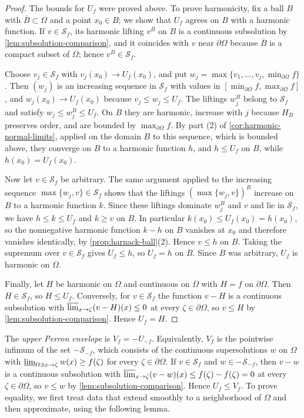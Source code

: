 \begin{proof}
The bounds for $U_f$ were proved above. To prove harmonicity, fix a ball $B$ with $\overline B\subset\Omega$ and a point $x_0\in B$; we show that $U_f$ agrees on $B$ with a harmonic function. If $v\in\mathcal S_f$, its harmonic lifting $v^B$ on $B$ is a continuous subsolution by \cref{lem:subsolution-comparison}, and it coincides with $v$ near $\partial\Omega$ because $\overline B$ is a compact subset of $\Omega$; hence $v^B\in\mathcal S_f$.

Choose $v_j\in\mathcal S_f$ with $v_j(x_0)\to U_f(x_0)$, and put $w_j=\max\{v_1,\ldots,v_j,\min_{\partial\Omega}f\}$. Then $(w_j)$ is an increasing sequence in $\mathcal S_f$ with values in $[\min_{\partial\Omega}f,\max_{\partial\Omega}f]$, and $w_j(x_0)\to U_f(x_0)$ because $v_j\leq w_j\leq U_f$. The liftings $w_j^B$ belong to $\mathcal S_f$ and satisfy $w_j\leq w_j^B\leq U_f$. On $B$ they are harmonic, increase with $j$ because $H_B$ preserves order, and are bounded by $\max_{\partial\Omega}f$. By part (2) of \cref{cor:harmonic-normal-limits}, applied on the domain $B$ to this sequence, which is bounded above, they converge on $B$ to a harmonic function $h$, and $h\leq U_f$ on $B$, while $h(x_0)=U_f(x_0)$.

Now let $v\in\mathcal S_f$ be arbitrary. The same argument applied to the increasing sequence $\max\{w_j,v\}\in\mathcal S_f$ shows that the liftings $(\max\{w_j,v\})^B$ increase on $B$ to a harmonic function $k$. Since these liftings dominate $w_j^B$ and $v$ and lie in $\mathcal S_f$, we have $h\leq k\leq U_f$ and $k\geq v$ on $B$. In particular $k(x_0)\leq U_f(x_0)=h(x_0)$, so the nonnegative harmonic function $k-h$ on $B$ vanishes at $x_0$ and therefore vanishes identically, by \cref{prop:harnack-ball}(2). Hence $v\leq h$ on $B$. Taking the supremum over $v\in\mathcal S_f$ gives $U_f\leq h$, so $U_f=h$ on $B$. Since $B$ was arbitrary, $U_f$ is harmonic on $\Omega$.

Finally, let $H$ be harmonic on $\Omega$ and continuous on $\overline\Omega$ with $H=f$ on $\partial\Omega$. Then $H\in\mathcal S_f$, so $H\leq U_f$. Conversely, for $v\in\mathcal S_f$ the function $v-H$ is a continuous subsolution with $\varlimsup_{x\to\zeta}(v-H)(x)\leq0$ at every $\zeta\in\partial\Omega$, so $v\leq H$ by \cref{lem:subsolution-comparison}. Hence $U_f=H$.
\end{proof}

The \emph{upper Perron envelope} is $V_f=-U_{-f}$. Equivalently, $V_f$ is the pointwise infimum of the set $-\mathcal S_{-f}$, which consists of the continuous supersolutions $w$ on $\Omega$ with $\varliminf_{\Omega\ni x\to\zeta}w(x)\geq f(\zeta)$ for every $\zeta\in\partial\Omega$. If $v\in\mathcal S_f$ and $w\in-\mathcal S_{-f}$, then $v-w$ is a continuous subsolution with $\varlimsup_{x\to\zeta}(v-w)(x)\leq f(\zeta)-f(\zeta)=0$ at every $\zeta\in\partial\Omega$, so $v\leq w$ by \cref{lem:subsolution-comparison}. Hence $U_f\leq V_f$. To prove equality, we first treat data that extend smoothly to a neighborhood of $\overline\Omega$ and then approximate, using the following lemma.

